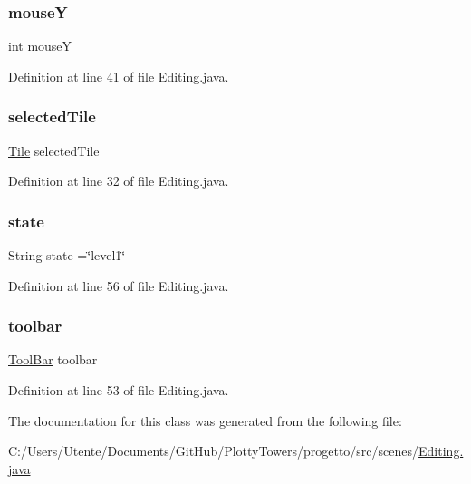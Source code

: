 \subsubsection{\texorpdfstring{mouseY}{mouseY}}
{\footnotesize\ttfamily int mouseY\hspace{0.3cm}{\ttfamily [private]}}



Definition at line 41 of file Editing.\+java.

\mbox{\label{classscenes_1_1_editing_a57de6d93afd033cf117e53aec7cf844a}} 
\subsubsection{\texorpdfstring{selected\+Tile}{selectedTile}}
{\footnotesize\ttfamily \hyperlink{classobjects_1_1_tile}{Tile} selected\+Tile\hspace{0.3cm}{\ttfamily [private]}}



Definition at line 32 of file Editing.\+java.

\mbox{\label{classscenes_1_1_editing_a91ac952876f776b3fbbc8519e093fdbf}} 
\subsubsection{\texorpdfstring{state}{state}}
{\footnotesize\ttfamily String state =\char`\"{}level1\char`\"{}\hspace{0.3cm}{\ttfamily [private]}}



Definition at line 56 of file Editing.\+java.

\mbox{\label{classscenes_1_1_editing_a2da79d490f532bdeeaee3eb967fabb13}} 
\subsubsection{\texorpdfstring{toolbar}{toolbar}}
{\footnotesize\ttfamily \hyperlink{classui_1_1_tool_bar}{Tool\+Bar} toolbar\hspace{0.3cm}{\ttfamily [private]}}



Definition at line 53 of file Editing.\+java.



The documentation for this class was generated from the following file\+:\begin{DoxyCompactItemize}
\item 
C\+:/\+Users/\+Utente/\+Documents/\+Git\+Hub/\+Plotty\+Towers/progetto/src/scenes/\hyperlink{_editing_8java}{Editing.\+java}\end{DoxyCompactItemize}
